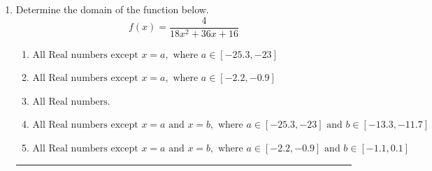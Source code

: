 \documentclass[14pt]{extbook}
\newcommand{\litem}[1]{\item#1\hspace*{-1cm}\rule{\textwidth}{0.4pt}}
\begin{document}
\begin{enumerate}
\litem{
Determine the domain of the function below.\[ f(x) = \frac{4}{18x^{2} +36 x + 16} \]\begin{enumerate}[label=\Alph*.]
\item \( \text{All Real numbers except } x = a, \text{ where } a \in [-25.3, -23] \)
\item \( \text{All Real numbers except } x = a, \text{ where } a \in [-2.2, -0.9] \)
\item \( \text{All Real numbers.} \)
\item \( \text{All Real numbers except } x = a \text{ and } x = b, \text{ where } a \in [-25.3, -23] \text{ and } b \in [-13.3, -11.7] \)
\item \( \text{All Real numbers except } x = a \text{ and } x = b, \text{ where } a \in [-2.2, -0.9] \text{ and } b \in [-1.1, 0.1] \)


\end{enumerate}}
\end{enumerate}
\end{document}

